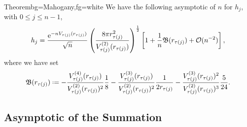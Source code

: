 \begin{frame}
	\begin{colorblock}{Theorem}{bg=Mahogany,fg=white}
	We have the following asymptotic of $n$ for $h_j$, with $0 \leq j \leq n-1$,
	\begin{equation*}
		h_j = \frac{\operatorname{e}^{-n V_{\tau(j)}(r_{\tau(j)})}}{\sqrt{n}} \left( \frac{8\pi r_{\tau(j)}^2}{V^{(2)}_{\tau(j)}(r_{\tau(j)})} \right)^{\frac{1}{2}} \left[ 1 + \frac{1}{n} \mathfrak{B}(r_{\tau(j)}) + \mathcal{O}(n^{-2}) \right],
		\label{Equation: Asymptotic hj annulus}
	\end{equation*}
	where we have set 
	\begin{equation*}
		\mathfrak{B}(r_{\tau(j)}) \deff -\frac{V^{(4)}_{\tau(j)}(r_{\tau(j)})}{V^{(2)}_{\tau(j)}(r_{\tau(j)})^2} \frac{1}{8} - \frac{V^{(3)}_{\tau(j)}(r_{\tau(j)})}{V^{(2)}_{\tau(j)}(r_{\tau(j)})^{2}} \frac{1}{2 r_{\tau(j)}} - \frac{V^{(3)}_{\tau(j)}(r_{\tau(j)})^2}{V^{(2)}_{\tau(j)}(r_{\tau(j)})^{3}} \frac{5}{24}.
	\end{equation*}
	\end{colorblock}
\end{frame}

\subsection{Asymptotic of the Summation}


